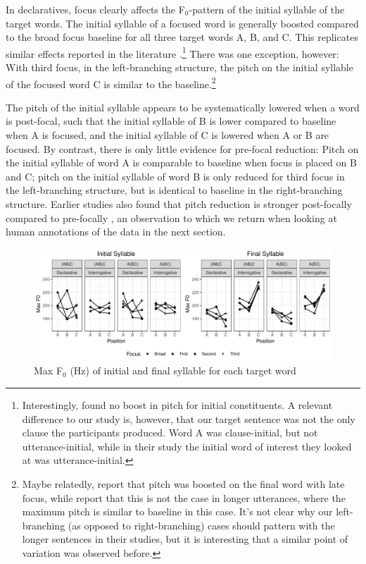 \documentclass[preprint,review,12pt,authoryear,times]{elsarticle}
\begin{document}
In declaratives, focus clearly affects the F$_0$-pattern of the initial syllable of the target words. The initial syllable of a focused word is generally boosted compared to the broad focus baseline for all three target words A, B, and C.  This replicates similar effects reported in the literature \citep[][i.a.]{eady86,breenetal10}.\footnote{Interestingly, \citet{eady86} found no boost in pitch for initial constituents. A relevant difference to our study is, however, that our target sentence was not the only clause the participants produced. Word A was clause-initial, but not utterance-initial, while in their study the initial word of interest they looked at was utterance-initial.} There was one exception, however: With third focus, in the left-branching structure, the pitch on the initial syllable of the focused word C is similar to the baseline.\footnote{Maybe relatedly, \citet{eady86} report that pitch was boosted on the final word with late focus, while \citet{coope85} report that this is not the case in longer utterances, where the maximum pitch is similar to baseline in this case. It's not clear why our left-branching (as opposed to right-branching) cases should pattern with the longer sentences in their studies, but it is interesting that a similar point of variation was observed before.}

The pitch of the initial syllable appears to be systematically lowered when a word is post-focal, such that the initial syllable of B is lower compared to baseline when A is focused, and the initial syllable of C is lowered when A or B are focused. By contrast, there is only little evidence for pre-focal reduction: Pitch on the initial syllable of word A is comparable to baseline when focus is placed on B and C; pitch on the initial syllable of word B is only reduced for third focus in the left-branching structure, but is identical to baseline in the right-branching structure. Earlier studies also found that pitch reduction is stronger post-focally compared to pre-focally \citet{eady86,eady86dual}, an observation to which we return when looking at human annotations of the data in the next section.


\begin{figure}[ht!]
	\begin{center}
		\includegraphics[width=5.4in]{Figures/Max_F0.pdf}
		\caption{Max F$_0$ (Hz) of initial and final syllable for each target word}
		\label{figurePitch}
	\end{center}
\end{figure}
\end{document}

